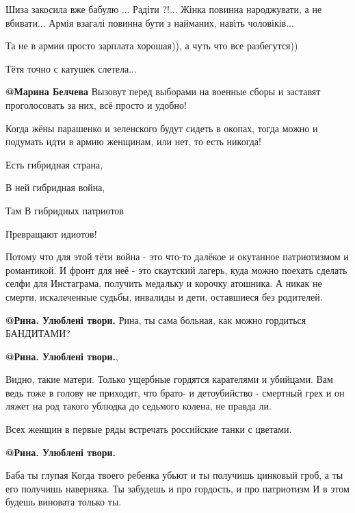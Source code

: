 \begin{itemize}

Шиза закосила вже бабулю ... Радіти ?!... Жінка повинна народжувати, а не
вбивати... Армія взагалі повинна бути з найманих, навіть чоловіків...


Та не в армии просто зарплата хорошая)), а чуть что все разбегутся))

Тётя точно с катушек слетела...

\textbf{@Марина Белчева}  Вызовут перед выборами на военные сборы и заставят проголосовать за них, всё просто и удобно!


Когда жёны парашенко и зеленского будут сидеть в окопах,  тогда можно и
подумать идти в армию женщинам,  или нет, то есть никогда! 


Есть гибридная страна, 

В ней гибридная война, 

Там В гибридных патриотов

Превращают идиотов!


Потому что для этой тёти война - это что-то далёкое и окутанное патриотизмом и
романтикой. И фронт для неё - это скаутский лагерь, куда можно поехать сделать
селфи для Инстаграма, получить медальку и корочку атошника.  А никак не смерти,
искалеченные судьбы, инвалиды и дети, оставшиеся без родителей. 

\textbf{@Рина. Улюблені твори.}  Рина, ты сама больная, как можно гордиться БАНДИТАМИ?

\textbf{@Рина. Улюблені твори.}, 

Видно, такие матери. Только ущербные гордятся карателями и убийцами. Вам ведь
тоже в голову не приходит, что брато- и детоубийство - смертный грех и он ляжет
на род такого ублюдка до седьмого колена, не правда ли.


Всех женщин в первые ряды встречать российские танки с цветами.

\textbf{@Рина. Улюблені твори.}  

Баба ты глупая Когда твоего ребенка убьют и ты получишь цинковый гроб, а ты его
получишь наверняка. Ты забудешь и про гордость, и про патриотизм И в этом будешь
виновата только ты.


\end{itemize}
